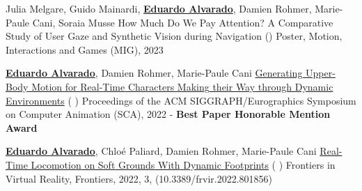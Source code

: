 

\begin{cventries}

\cvpublication
    {Julia Melgare, Guido Mainardi, \textbf{\underline{Eduardo Alvarado}}, Damien Rohmer, Marie-Paule Cani, Soraia Musse} %
    {{How {Much} {Do} {We} {Pay} {Attention}? {A} {Comparative} {Study} of {User} {Gaze} and {Synthetic} {Vision} during {Navigation}} (\href{https://project.inria.fr/mig2023/files/2023/11/poster_6.pdf}{})} %
    {Poster, Motion, Interactions and Games (MIG), 2023} %

\cvpublication
    {\textbf{\underline{Eduardo Alvarado}}, Damien Rohmer, Marie-Paule Cani} %
    {\href{https://edualvarado.com/generating-upper-body-motion/} {Generating {Upper}-{Body} {Motion} for {Real}-{Time} {Characters} {Making} their {Way} through {Dynamic} {Environments}} (\href{https://github.com/edualvarado/unity-antagonistic-controller}{} \href{https://hal.inria.fr/hal-03757439v1}{} \href{https://www.youtube.com/watch?v=dq4FJH1atWM}{})} %
    {Proceedings of the ACM SIGGRAPH/Eurographics Symposium on Computer Animation (SCA), 2022 - \textbf{Best Paper Honorable Mention Award}} %
    
\cvpublication
    {\textbf{\underline{Eduardo Alvarado}}, Chloé Paliard, Damien Rohmer, Marie-Paule Cani} %
    {\href{https://edualvarado.com/soft-grounds/}{Real-{Time} {Locomotion} on {Soft} {Grounds} {With} {Dynamic} {Footprints}} (\href{https://github.com/edualvarado/unity-footprints}{} \href{https://hal.inria.fr/hal-03630136}{} \href{https://youtu.be/aWBntnCOwEE}{})} %
    {Frontiers in Virtual Reality, Frontiers, 2022, 3, (10.3389/frvir.2022.801856)} %


\end{cventries}
